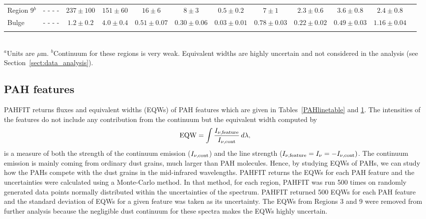 \begin{table}
\begin{minipage}{200mm}
\begin{tabular}{l c c  c  c  c  c  c  c  c  c c }
 Region 9$^b$ & - - - -                 & $237\pm100$          & $151\pm60$        & $16\pm6$                 & $8\pm3$                   & $0.5\pm0.2$             & $7\pm1$                   & $2.3\pm0.6$             & $3.6\pm0.8$                 & $2.4\pm0.8$  \\
 Bulge       & - - - -                          & $1.2\pm0.2$            & $4.0\pm0.4$        & $0.51\pm0.07$         & $0.30\pm0.06$        & $0.03\pm0.01$        & $0.78\pm0.03$        & $0.22\pm0.02$        & $0.49\pm0.03$            & $1.16\pm0.04$ \\             
\hline
 \label{EQW}
\end{tabular}\\
{$^a$Units are $\mu$m. 
$^b$Continuum for these regions is very weak.  Equivalent widths are highly uncertain and not considered in the analysis (see Section~\ref{sect:data_analysis}).}
\end{minipage}
\end{table}



\subsection{PAH features}
\label{sect:pah}

PAHFIT returns fluxes and equivalent widths (EQWs) of PAH features which are given in Tables~\ref{PAHlinetable} and \ref{EQW}. The intensities of the features do not include any contribution from the continuum but the equivalent width computed by
\begin{equation}
{\rm EQW}=\int \frac{I_{\nu,{\rm feature}}}{I_{\nu, {\rm cont}}} \,d\lambda,
\end{equation}
is a measure of both the strength of the continuum emission ($I_{\nu, {\rm cont}} $) and the line strength 
($I_{\nu,{\rm feature}}=I_{\nu} =- I_{\nu, {\rm cont}})$. 
The continuum emission is mainly coming from ordinary dust grains, much larger than PAH molecules. Hence, by studying EQWs of PAHs, 
we can study how the PAHs compete with the dust grains in the mid-infrared wavelengths.  PAHFIT returns the EQWs for each PAH 
feature and the uncertainties were calculated using a Monte-Carlo method. In that method, for each region, PAHFIT was run 500 times on 
randomly generated data points  normally distributed within the uncertainties of the spectrum. PAHFIT returned 500 EQWs for each 
PAH feature and the standard deviation of EQWs for a given feature was taken as its uncertainty. 
The EQWs from Regions 3 and 9 were removed from further analysis because the negligible dust continuum for these spectra makes
the EQWs highly uncertain.


